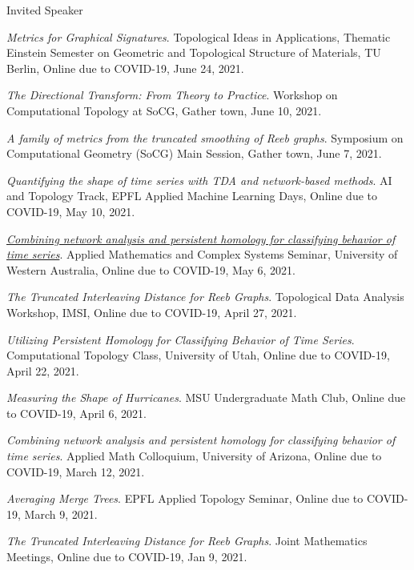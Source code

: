 \documentclass{resume} %
\begin{document}
\begin{rSection}{Invited Speaker}
\begin{etaremune}
\item\emph{Metrics for Graphical Signatures}. Topological Ideas in Applications, Thematic Einstein Semester on Geometric and Topological Structure of Materials, TU Berlin, Online due to COVID-19, June 24, 2021. 

\item\emph{The Directional Transform: From Theory to Practice}. Workshop on Computational Topology at SoCG, Gather town, June 10, 2021. 

\item\emph{A family of metrics from the truncated smoothing of Reeb graphs}. Symposium on Computational Geometry (SoCG) Main Session, Gather town, June 7, 2021. 

\item\emph{Quantifying the shape of time series with TDA and network-based methods}. AI and Topology Track, EPFL Applied Machine Learning Days, Online due to COVID-19, May 10, 2021. 

\item\emph{\href{https://www.youtube.com/watch?v=EUVk-FXbIog}{Combining network analysis and persistent homology for classifying behavior of time series}}. Applied Mathematics and Complex Systems Seminar, University of Western Australia, Online due to COVID-19, May 6, 2021. 

\item\emph{The Truncated Interleaving Distance for Reeb Graphs}. Topological Data Analysis Workshop, IMSI, Online due to COVID-19, April 27, 2021. 

\item\emph{Utilizing Persistent Homology for Classifying Behavior of Time Series}. Computational Topology Class, University of Utah, Online due to COVID-19, April 22, 2021. 

\item\emph{Measuring the Shape of Hurricanes}. MSU Undergraduate Math Club, Online due to COVID-19, April 6, 2021. 

\item\emph{Combining network analysis and persistent homology for classifying behavior of time series}. Applied Math Colloquium, University of Arizona, Online due to COVID-19, March 12, 2021. 

\item\emph{Averaging Merge Trees}. EPFL Applied Topology Seminar, Online due to COVID-19, March 9, 2021. 

\item\emph{The Truncated Interleaving Distance for Reeb Graphs}. Joint Mathematics Meetings, Online due to COVID-19, Jan 9, 2021. 


\end{etaremune}
\end{rSection}
\end{document}

